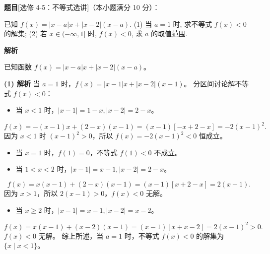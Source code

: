 \begin{answer}

\textbf{题目}[选修 4-5：不等式选讲]（本小题满分 10 分）：

已知 $f(x) = |x - a|x + |x - 2|(x - a)$.
(1) 当 $a = 1$ 时, 求不等式 $f(x) < 0$ 的解集;
(2) 若 $x \in (-\infty, 1]$ 时, $f(x) < 0$, 求 $a$ 的取值范围.

\textbf{解析}

已知函数 $f(x) = |x - a|x + |x - 2|(x - a)$。

\textbf{(1) 解析}
当 $a = 1$ 时，$f(x) = |x - 1|x + |x - 2|(x - 1)$。
分区间讨论解不等式 $f(x) < 0$：
\begin{itemize}
\item 当 $x < 1$ 时，$|x - 1| = 1 - x, |x - 2| = 2 - x$。
\end{itemize}
\nopagebreak[4]
\[f(x) = -(x - 1)x + (2 - x)(x - 1) = (x - 1)[-x + 2 - x] = -2(x - 1)^2.\]
  因为 $x < 1$ 时 $(x - 1)^2 > 0$，所以 $f(x) = -2(x - 1)^2 < 0$ 恒成立。
\begin{itemize}
\item 当 $x = 1$ 时，$f(1) = 0$，不等式 $f(1) < 0$ 不成立。
\item 当 $1 < x < 2$ 时，$|x - 1| = x - 1, |x - 2| = 2 - x$。
\end{itemize}
\nopagebreak[4]
\[f(x) = x(x - 1) + (2 - x)(x - 1) = (x - 1)[x + 2 - x] = 2(x - 1).\]
  因为 $x > 1$，所以 $2(x - 1) > 0$，$f(x) < 0$ 无解。
\begin{itemize}
\item 当 $x \geqslant 2$ 时，$|x - 1| = x - 1, |x - 2| = x - 2$。
\end{itemize}
\nopagebreak[4]
\[f(x) = x(x - 1) + (x - 2)(x - 1) = (x - 1)[x + x - 2] = 2(x - 1)^2 > 0.\]
  $f(x) < 0$ 无解。
综上所述，当 $a = 1$ 时，不等式 $f(x) < 0$ 的解集为 $\{x \mid x < 1\}$。


\end{answer}
